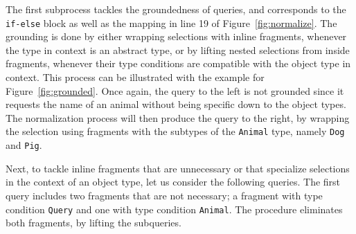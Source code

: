 The first subprocess tackles the groundedness of queries, and corresponds to the \texttt{if-else} block  as well as the mapping in line 19 of Figure~\ref{fig:normalize}. The grounding is done by either wrapping selections with inline fragments, whenever the type in context is an abstract type, or by lifting nested selections from inside fragments, whenever their type conditions are compatible with the object type in context. This process can be illustrated with the example for Figure~\ref{fig:grounded}.  Once again, the query to the left is not grounded since it requests the name of an animal without being specific down to the object types. The normalization process will then produce the query to the right, by wrapping the selection using fragments with the subtypes of the \texttt{Animal} type, namely \texttt{Dog} and \texttt{Pig}.

\iffalse
\td{This is the same example as above, so it can be reused}
\begin{verbatim}
// Not grounded query
query {
    goodboi {
        name
    }
}
// Normalized query
query {
    goodboi {
        |$\ldots$| on Dog {
	    name
	}
	|$\ldots$| on Pig {
	    name
	}
    }	
}
\end{verbatim} 
\fi


  
Next, to tackle inline fragments that are unnecessary or that specialize selections in the context of an object type, let us consider the following queries. The first query includes two fragments that are not necessary; a fragment with type condition \texttt{Query} and one with type condition \texttt{Animal}. The procedure eliminates both fragments, by lifting the subqueries.

